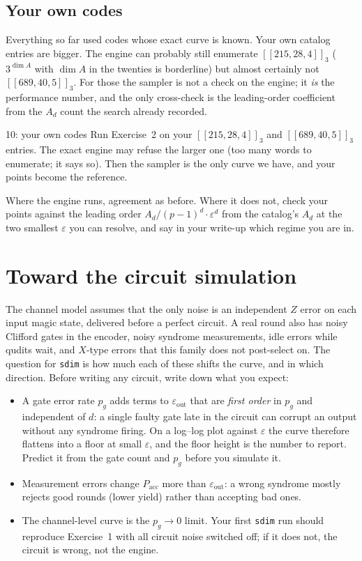 \documentclass[11pt]{article}
\newcommand{\eps}{\varepsilon}
\newcommand{\code}[1]{\texttt{#1}}
\begin{document}
\subsection*{Your own codes}

Everything so far used codes whose exact curve is known. Your own catalog entries
are bigger. The engine can probably still enumerate $[[215,28,4]]_3$ ($3^{\dim A}$
with $\dim A$ in the twenties is borderline) but almost certainly not
$[[689,40,5]]_3$. For those the sampler is not a check on the engine; it \emph{is} the
performance number, and the only cross-check is the leading-order coefficient from
the $A_d$ count the search already recorded.

\begin{exercise}{10: your own codes}
Run Exercise~2 on your $[[215,28,4]]_3$ and $[[689,40,5]]_3$ entries. The exact engine
may refuse the larger one (too many words to enumerate; it says so). Then the
sampler is the only curve we have, and your points become the reference.
\end{exercise}
\begin{checkbox}
Where the engine runs, agreement as before. Where it does not, check your points
against the leading order $A_d/(p-1)^d\cdot\eps^{d}$ from the catalog's $A_d$ at the
two smallest $\eps$ you can resolve, and say in your write-up which regime you are in.
\end{checkbox}

\section{Toward the circuit simulation}
\label{sec:sdim}

The channel model assumes that the only noise is an independent $Z$ error on each
input magic state, delivered before a perfect circuit. A real round also has noisy
Clifford gates in the encoder, noisy syndrome measurements, idle errors while
qudits wait, and $X$-type errors that this family does not post-select on. The
question for \code{sdim} is how much each of these shifts the curve, and in which
direction. Before writing any circuit, write down what you expect:

\begin{itemize}[nosep]
\item A gate error rate $p_g$ adds terms to $\eps_{\mathrm{out}}$ that are
  \emph{first order} in $p_g$ and independent of $d$: a single faulty gate late in the
  circuit can corrupt an output without any syndrome firing. On a log--log plot
  against $\eps$ the curve therefore flattens into a floor at small $\eps$, and the
  floor height is the number to report. Predict it from the gate count and $p_g$
  before you simulate it.
\item Measurement errors change $P_{\mathrm{acc}}$ more than $\eps_{\mathrm{out}}$:
  a wrong syndrome mostly rejects good rounds (lower yield) rather than accepting
  bad ones.
\item The channel-level curve is the $p_g\to0$ limit. Your first \code{sdim} run should
  reproduce Exercise~1 with all circuit noise switched off; if it does not, the
  circuit is wrong, not the engine.
\end{itemize}
\end{document}
